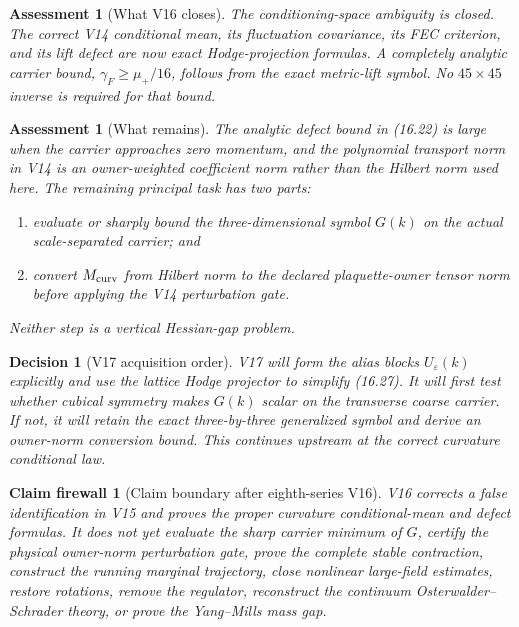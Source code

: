 \documentclass[11pt,oneside]{book}
\newtheorem{assessment}[theorem]{Assessment}
\newtheorem{firewall}[theorem]{Claim firewall}
\newtheorem{decision}[theorem]{Decision}
\theoremstyle{definition}
\theoremstyle{remark}
\begin{document}
\begin{assessment}[What V16 closes]
\label{ass:e8v16-closes}
The conditioning-space ambiguity is closed.  The correct V14
conditional mean, its fluctuation covariance, its FEC criterion, and
its lift defect are now exact Hodge-projection formulas.  A completely
analytic carrier bound,
\(\gamma_F\geq\mu_+/16\), follows from the exact metric-lift symbol.
No \(45\times45\) inverse is required for that bound.
\end{assessment}

\begin{assessment}[What remains]
\label{ass:e8v16-remains}
The analytic defect bound in (16.22) is large when the carrier
approaches zero momentum, and the polynomial transport norm in V14 is
an owner-weighted coefficient norm rather than the Hilbert norm used
here.  The remaining principal task has two parts:
\begin{enumerate}
\item evaluate or sharply bound the three-dimensional symbol \(G(k)\)
on the actual scale-separated carrier; and
\item convert \(M_{\rm curv}\) from Hilbert norm to the declared
plaquette-owner tensor norm before applying the V14 perturbation gate.
\end{enumerate}
Neither step is a vertical Hessian-gap problem.
\end{assessment}

\begin{decision}[V17 acquisition order]
\label{dec:e8v16-v17}
V17 will form the alias blocks \(U_\varepsilon(k)\) explicitly and
use the lattice Hodge projector to simplify (16.27).  It will first
test whether cubical symmetry makes \(G(k)\) scalar on the transverse
coarse carrier.  If not, it will retain the exact three-by-three
generalized symbol and derive an owner-norm conversion bound.  This
continues upstream at the correct curvature conditional law.
\end{decision}

\begin{firewall}[Claim boundary after eighth-series V16]
\label{fire:e8v16-claim}
V16 corrects a false identification in V15 and proves the proper
curvature conditional-mean and defect formulas.  It does not yet
evaluate the sharp carrier minimum of \(G\), certify the physical
owner-norm perturbation gate, prove the complete stable contraction,
construct the running marginal trajectory, close nonlinear
large-field estimates, restore rotations, remove the regulator,
reconstruct the continuum Osterwalder--Schrader theory, or prove the
Yang--Mills mass gap.
\end{firewall}
\end{document}
